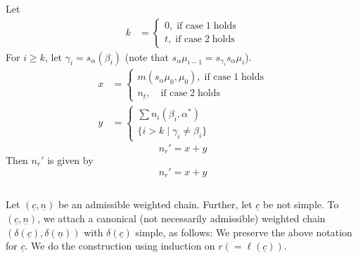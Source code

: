 Let
\begin{align*}
k &=
\begin{cases}
0,\; \text{if case}\; 1 \; \text{holds}\\
t, \; \text{if case}\; 2 \;\text{holds}
 \end{cases}
\end{align*}
For $i\geq k$, let $\gamma_{i}=s_{\alpha}(\beta_{i})$ (note that $s_{\alpha}\mu_{i-1}= s_{\gamma_{i}}s_{\alpha}\mu_{i}$).
\begin{align*}
x&=
\begin{cases}
m(s_{\alpha}\mu_{0}, \mu_{0}), \; \text{if case} \; 1\; \text{holds}\\
n_{t}, \quad \text{if case}\; 2 \; \text{holds}
\end{cases}\\
y&=
\begin{cases}
\sum n_{i}(\beta_{i}, \alpha^{*})\\
\{i > k \;|\; \gamma_{i} \neq \beta_{i}\}
\end{cases}
\end{align*}
$$
n_{r}'= x+y
$$
Then $n_{r}'$ is given by
$$
n_{r}' = x+y
$$

\subsection{}\label{art9-subsec-3.8}

Let $(\underline{c}, \underline{n})$ be an admissible weighted chain. Further, let $\underline{c}$ be not simple. To $(\underline{c}, \underline{n})$, we attach a canonical (not necessarily admissible) weighted chain $(\delta(\underline{c}), \delta(\underline{n}))$ with $\delta(\underline{c})$ simple, as follows: We preserve the above notation for $\underline{c}$. We do the construction using induction on $r(=\ell(\underline{c}))$. 

